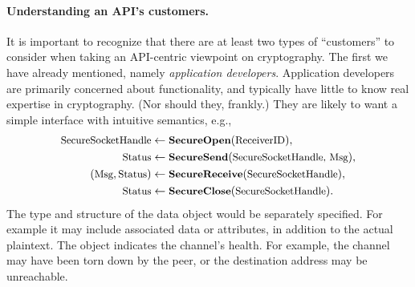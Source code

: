 \paragraph{Understanding an API's customers. }
It is important to recognize that there are at least two types of ``customers''
to consider when taking an API-centric viewpoint on cryptography. The first we
have already mentioned, namely \emph{application developers}. Application developers
are primarily concerned about functionality, and typically have little
to know real expertise in cryptography.  (Nor should they, frankly.)
%
%
They are likely to want a simple interface with
intuitive semantics, e.g.,
\begin{align*}
\textrm{\small SecureSocketHandle}&\gets\textrm{\small\bf SecureOpen}(\textrm{\small ReceiverID}), \\
\textrm{\small Status}&\gets\textrm{\small\bf SecureSend}(\textrm{\small SecureSocketHandle, Msg}),\\
  (\textrm{\small Msg}, \textrm{\small Status}) &\gets\textrm{\small\bf SecureReceive}(\textrm{\small SecureSocketHandle}), \\
\textrm{\small Status}&\gets\textrm{\small\bf SecureClose}(\textrm{\small SecureSocketHandle}).
\end{align*}
%
The type and structure of the data object  would be separately
specified. For example it may include associated data or attributes, in addition
to the actual plaintext.
%
The object  indicates the channel's health. For example, the
channel may have been torn down by the peer, or the destination address may be
unreachable.

